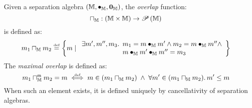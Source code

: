 %
%
\begin{definition}[Overlap]
Given a separation algebra $\left(\mathbb{M}, \bullet_{\mathbb{M}}, \mathbf{0}_{\mathbb{M}} \right)$, the \emph{overlap} function:
%
\[
\sqcap_{\mathbb{M}} : \left(\mathbb{M} \times \mathbb{M} \right)\rightarrow \mathscr{P}\left(\mathbb{M} \right)
\]
%
is defined as:
%
\[
	m_1 \meet{\mathbb{M}} m_2 \eqdef 
	\left\{ m \mid 
					\begin{array}{l @{\hspace{3pt}} l}
						\exsts{m', m'', m_3} & m_1 = m \compose{\mathbb{M}} m' \land m_2 = m \compose{\mathbb{M}} m'' \land\\
						&m \compose{\mathbb{M}} m' \compose{\mathbb{M}} m'' = m_3 					
					\end{array}
					\right\}
\]
%
The \emph{maximal overlap} is defined as:
%
\[
	m_1 \sqcap_{\mathbb{M}}^{\textsf{m}} m_2 = m \mathrel{\stackrel{\smash{\scriptscriptstyle{\mathrm{def}}}}{\iff}} m \in (m_1 \sqcap_{\mathbb{M}} m_2) \;\land\; \forall m' \in (m_1 \sqcap_{\mathbb{M}} m_2).\, m' \leq m
\]
%
When such an element exists, it is defined uniquely by cancellativity of separation algebras.
\end{definition}
%
%

%
%
